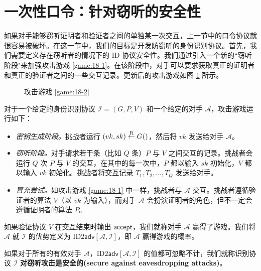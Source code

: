 \section{一次性口令：针对窃听的安全性}\label{sec:18-5}

如果对手能够窃听证明者和验证者之间的单独某一次交互，上一节中的口令协议就很容易被破坏。在这一节中，我们的目标是开发防窃听的身份识别协议。首先，我们需要定义存在窃听者的情况下的 ID 协议安全性。我们通过引入一个新的``窃听阶段"来加强攻击游戏 \ref{game:18-1}。在该阶段中，对手可以要求获取真正的证明者和真正的验证者之间的一些交互记录。更新后的攻击游戏如图 \ref{fig:18-7} 所示。

\begin{figure}
  \centering
  
  \caption{攻击游戏 \ref{game:18-2}}
  \label{fig:18-7}
\end{figure}

\begin{game}\label{game:18-2}
对于一个给定的身份识别协议 $\mathcal{I}=(G,P,V)$ 和一个给定的对手 $\mathcal{A}$，攻击游戏运行如下：
\begin{itemize}
	\item \emph{密钥生成阶段。}挑战者运行 $(vk,sk)\overset{\rm R}\leftarrow G()$，然后将 $vk$ 发送给对手 $\mathcal{A}$。
	\item \emph{窃听阶段。}对手请求若干条（比如 $Q$ 条）$P$ 与 $V$ 之间交互的记录。挑战者会运行 $Q$ 次 $P$ 与 $V$ 的交互，在其中的每一次中，$P$ 都以输入 $sk$ 初始化，$V$ 都以输入 $vk$ 初始化。挑战者将交互记录 $T_1,T_2,\dots,T_Q$ 发送给对手。
	\item \emph{冒充尝试。}如攻击游戏 \ref{game:18-1} 中一样，挑战者与 $\mathcal{A}$ 交互。挑战者遵循验证者的算法 $V$（以 $vk$ 为输入），而对手 $\mathcal{A}$ 会扮演证明者的角色，但不一定会遵循证明者的算法 $P$。
\end{itemize}
如果验证协议 $V$ 在交互结束时输出 $\mathsf{accept}$，我们就称对手 $\mathcal{A}$ 赢得了游戏。我们将 $\mathcal{A}$ 就
$\mathcal{I}$ 的优势定义为 $\mathrm{ID2}\mathsf{adv}[\mathcal{A},\mathcal{I}]$，即 $\mathcal{A}$ 赢得游戏的概率。
\end{game}

\begin{definition}\label{def:18-6}
如果对于所有的有效对手 $\mathcal{A}$，$\mathrm{ID2}\mathsf{adv}[\mathcal{A},\mathcal{I}]$ 的值都可忽略不计，我们就称识别协议 $\mathcal{I}$ \textbf{对窃听攻击是安全的(secure against eavesdropping attacks)}。
\end{definition}

